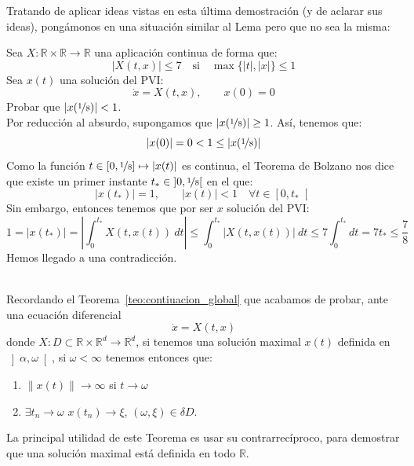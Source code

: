 
\noindent
Tratando de aplicar ideas vistas en esta última demostración (y de aclarar sus ideas), pongámonos en una situación similar al Lema pero que no sea la misma:

\begin{ejemplo}
    Sea $X:\mathbb{R}\times\mathbb{R}\to \mathbb{R}$ una aplicación continua de forma que:
    \begin{equation*}
        |X(t,x)| \leq 7 \quad \text{si}\quad \max\{|t|,|x|\} \leq 1
    \end{equation*}
    Sea $x(t)$ una solución del PVI:
    \begin{equation*}
        \dot{x} = X(t,x), \qquad x(0) = 0
    \end{equation*}
    Probar que $|x(\nicefrac{1}{8})|<1$.\\

    \noindent
    Por reducción al absurdo, supongamos que $|x(\nicefrac{1}{8})|\geq 1$. Así, tenemos que:
    \begin{equation*}
        |x(0)| = 0 < 1 \leq |x(\nicefrac{1}{8})|
    \end{equation*}
    Como la función $t\in [0,\nicefrac{1}{8}]\mapsto |x(t)|$ es continua, el Teorema de Bolzano nos dice que existe un primer instante $t_\ast \in \left]0,\nicefrac{1}{8}\right[$ en el que:
    \begin{equation*}
        |x(t_\ast)| = 1, \qquad |x(t)| < 1 \quad \forall t\in \left[0,t_\ast\right[
    \end{equation*}
    Sin embargo, entonces tenemos que por ser $x$ solución del PVI:
    \begin{equation*}
        1 = |x(t_\ast)| = \left|\int_{0}^{t_\ast} X(t,x(t))~dt \right| \leq \int_{0}^{t_\ast} |X(t,x(t))|~dt  \leq 7\int_{0}^{t_\ast}dt = 7t_\ast \leq \frac{7}{8}
    \end{equation*}
    Hemos llegado a una contradicción.
\end{ejemplo}~\\

\noindent
Recordando el Teorema~\ref{teo:contiuacion_global} que acabamos de probar, ante una ecuación diferencial
\begin{equation*}
    \dot{x} = X(t,x)
\end{equation*}
donde $X:D\subset \mathbb{R}\times\mathbb{R}^d\to \mathbb{R}^d$, si tenemos una solución maximal $x(t)$ definida en $\left]\alpha,\omega\right[$, si $\omega < \infty$ tenemos entonces que:
\begin{enumerate}
    \item $\|x(t)\| \to \infty$ si $t\to \omega$
    \item $\exists t_n\to \omega$ $x(t_n)\to \xi$, $(\omega,\xi)\in \delta D$.
\end{enumerate}
La principal utilidad de este Teorema es usar su contrarrecíproco, para demostrar que una solución maximal está definida en todo $\mathbb{R}$.

